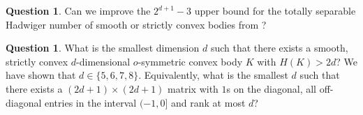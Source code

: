 \documentclass[a4paper,12pt]{article}
\theoremstyle{plain}
\theoremstyle{definition}
\newtheorem{question}[theorem]{Question}
\begin{document}
\begin{question}
Can we improve the $2^{d+1}-3$ upper bound for the totally separable Hadwiger 
number of smooth or strictly convex bodies from \cite{BN18}?
\end{question}

\begin{question}
What is the smallest dimension $d$ such that there exists a smooth, strictly convex $d$-dimensional $o$-symmetric convex body $K$ with $H(K) > 2d$?
We have shown that $d\in\{5,6,7,8\}$.
Equivalently, what is the smallest $d$ such that there exists a $(2d+1)\times (2d+1)$ matrix with $1$s on the diagonal, all off-diagonal entries in the interval $(-1,0]$ and rank at most $d$?
\end{question}
 

%
%
\providecommand{\bysame}{\leavevmode\hbox to3em{\hrulefill}\thinspace}
\providecommand{\MR}{\relax\ifhmode\unskip\space\fi MR }
\providecommand{\MRhref}[2]{%
  \href{http://www.ams.org/mathscinet-getitem?mr=#1}{#2}
}
\providecommand{\href}[2]{#2}
\end{document}
